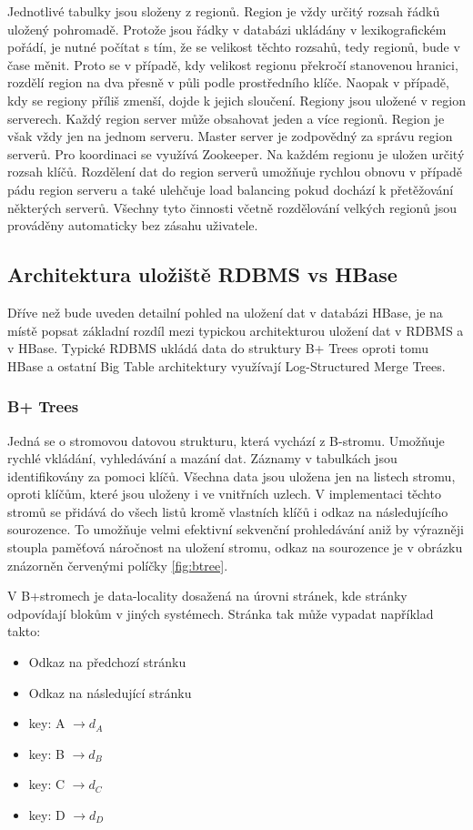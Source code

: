 \documentclass[thesis=M,czech]{FITthesis}[2012/06/26]
\begin{document}
Jednotlivé tabulky jsou složeny z regionů. Region je vždy určitý rozsah řádků uložený pohromadě. Protože jsou řádky v databázi ukládány v lexikografickém pořádí, je nutné počítat s tím, že se velikost těchto rozsahů, tedy regionů, bude v čase měnit. Proto se v případě, kdy velikost regionu překročí stanovenou hranici, rozdělí region na dva přesně v půli podle prostředního klíče. Naopak v případě, kdy se regiony příliš zmenší, dojde k jejich sloučení. Regiony jsou uložené v region serverech. Každý region server může obsahovat jeden a více regionů. Region je však vždy jen na jednom serveru. Master server je zodpovědný za správu region serverů. Pro koordinaci se využívá Zookeeper. Na každém regionu je uložen určitý rozsah klíčů. Rozdělení dat do region serverů umožňuje rychlou obnovu v případě pádu region serveru a také ulehčuje load balancing pokud dochází k přetěžování některých serverů. Všechny tyto činnosti včetně rozdělování velkých regionů jsou prováděny automaticky bez zásahu uživatele.

\subsection{Architektura uložiště RDBMS vs HBase}
Dříve než bude uveden detailní pohled na uložení dat v databázi HBase, je na místě popsat základní rozdíl mezi typickou architekturou uložení dat v RDBMS a v HBase. Typické RDBMS ukládá data do struktury B+ Trees oproti tomu HBase a ostatní Big Table architektury využívají Log-Structured Merge Trees\cite{hbase2011}.

\subsubsection{B+ Trees}
Jedná se o stromovou datovou strukturu, která vychází z B-stromu. Umožňuje rychlé vkládání, vyhledávání a mazání dat. Záznamy v tabulkách jsou identifikovány za pomoci klíčů. Všechna data jsou uložena jen na listech stromu, oproti klíčům, které jsou uloženy i ve vnitřních uzlech. V implementaci těchto stromů se přidává do všech listů kromě vlastních klíčů i odkaz na následujícího sourozence. To umožňuje velmi efektivní sekvenční prohledávání aniž by výrazněji stoupla paměťová náročnost na uložení stromu, odkaz na sourozence je v obrázku znázorněn červenými políčky \ref{fig:btree}. 

V B+stromech je data-locality dosažená na úrovni stránek, kde stránky odpovídají blokům v jiných systémech. Stránka tak může vypadat například takto:
\begin{itemize}
	\item Odkaz na předchozí stránku
	\item Odkaz na následující stránku
	\item key: A $\rightarrow d_A$
	\item key: B $\rightarrow d_B$
	\item key: C $\rightarrow d_C$
	\item key: D $\rightarrow d_D$
\end{itemize}
\end{document}
